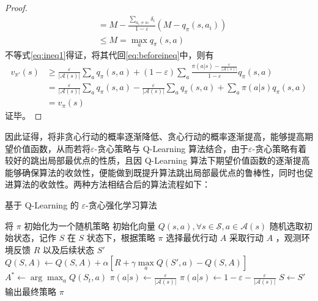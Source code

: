 \begin{proof}
\[\begin{aligned}
            &=M-\frac{\sum_{a_i\neq a_*}\delta_i}{1-\varepsilon}(M-q_\pi(s,a_i))\\
            &\leq M=\max\limits_aq_\pi(s,a)
            \end{aligned}
    \]
    不等式\ref{eq:ineq1}得证，将其代回\ref{eq:beforeineq}中，则有
    \[
        \begin{aligned}
            v_{\pi'}(s)&\geq\frac{\varepsilon}{|\mathcal A(s)|}\sum_aq_\pi(s,a)+(1-\varepsilon)\sum_a\frac{\pi(a|s)-\frac{\varepsilon}{|\mathcal A(s)|}}{1-\varepsilon}q_\pi(s,a)\\
            &=\frac{\varepsilon}{|\mathcal A(s)|}\sum_aq_\pi(s,a)-\frac{\varepsilon}{|\mathcal A(s)|}\sum_aq_\pi(s,a)+\sum_a\pi(a|s)q_\pi(s,a)\\
            &=v_\pi(s)
            \end{aligned}
    \]
    证毕。
\end{proof}

因此证得，将非贪心行动的概率逐渐降低、贪心行动的概率逐渐提高，能够提高期望价值函数，从而若将$\varepsilon$-贪心策略与 Q-Learning 算法结合，由于$\varepsilon$-贪心策略有着较好的跳出局部最优点的性质，且因 Q-Learning 算法下期望价值函数的逐渐提高能够确保算法的收敛性，便能做到既提升算法跳出局部最优点的鲁棒性，同时也促进算法的收敛性。两种方法相结合后的算法流程如下：

\begin{algorithm}[H]
    \caption{基于 Q-Learning 的 $\varepsilon$-贪心强化学习算法}
    \begin{algorithmic}[1] %
        \State 将 $\pi$ 初始化为一个随机策略
        \State 初始化向量 $Q(s,a), \forall s\in \mathcal S,a\in \mathcal{A}(s)$
        \Loop
        \State 随机选取初始状态，记作 $S$
        \Repeat
        \State 在 $S$ 状态下，根据策略 $\pi$ 选择最优行动 $A$
        \State 采取行动 $A$ ，观测环境反馈 $R$ 以及后续状态 $S'$
        \State $Q(S,A)\leftarrow Q(S,A)+\alpha\left[R+\gamma  \max\limits_aQ(S',a)-Q(S,A)\right]$
        \State $A^*\leftarrow\arg\max_aQ(S_t,a)$
        \State $\pi(a|s)\leftarrow \frac{\varepsilon}{|\mathcal A(s)|}$
        \Else
        \State $\pi(a|s)\leftarrow 1-\varepsilon-\frac{\varepsilon}{|\mathcal A(s)|}$
        \EndIf
        \EndFor
        \State $S\leftarrow S'$
        \EndLoop
        \State
        \State 输出最终策略 $\pi$
    \end{algorithmic}
\end{algorithm}

